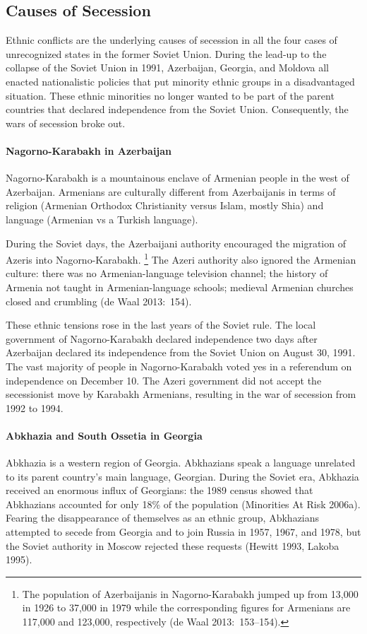 \documentclass[12pt,a4paper]{article}%
\begin{document}
\subsection{Causes of Secession}
Ethnic conflicts are the underlying causes of secession in all the four cases of unrecognized states in the former Soviet Union.
During the lead-up to the collapse of the Soviet Union in 1991, Azerbaijan, Georgia, and Moldova all enacted nationalistic policies that put minority ethnic groups in a disadvantaged situation. 
These ethnic minorities no longer wanted to be part of the parent countries that declared independence from the Soviet Union.
Consequently, the wars of secession broke out.

\paragraph{Nagorno-Karabakh in Azerbaijan}
Nagorno-Karabakh is a mountainous enclave of Armenian people in the west of Azerbaijan. 
Armenians are culturally different from Azerbaijanis in terms of religion (Armenian Orthodox Christianity versus Islam, mostly Shia) and language (Armenian vs a Turkish language). 

During the Soviet days, the Azerbaijani authority encouraged the migration of Azeris into Nagorno-Karabakh.%
\footnote{
	The population of Azerbaijanis in Nagorno-Karabakh jumped up from 13,000 in 1926 to 37,000 in 1979 while the corresponding figures for Armenians are 117,000 and 123,000, respectively (de Waal 2013:\ 153--154).
	} 
The Azeri authority also ignored the Armenian culture: there was no Armenian-language television channel; the history of Armenia not taught in Armenian-language schools; medieval Armenian churches closed and crumbling (de Waal 2013:\ 154).  

These ethnic tensions rose in the last years of the Soviet rule. 
The local government of Nagorno-Karabakh declared independence two days after Azerbaijan declared its independence from the Soviet Union on August 30, 1991. 
The vast majority of people in Nagorno-Karabakh voted yes in a referendum on independence on December 10. 
The Azeri government did not accept the secessionist move by Karabakh Armenians, resulting in the war of secession from 1992 to 1994.

\paragraph{Abkhazia and South Ossetia in Georgia}
Abkhazia is a western region of Georgia. Abkhazians speak a language unrelated to its parent country's main language, Georgian. 
During the Soviet era, Abkhazia received an enormous influx of Georgians: the 1989 census showed that Abkhazians accounted for only 18\% of the population (Minorities At Risk 2006a).
Fearing the disappearance of themselves as an ethnic group, Abkhazians attempted to secede from Georgia and to join Russia in 1957, 1967, and 1978, but the Soviet authority in Moscow rejected these requests (Hewitt 1993, Lakoba 1995).
\end{document}
